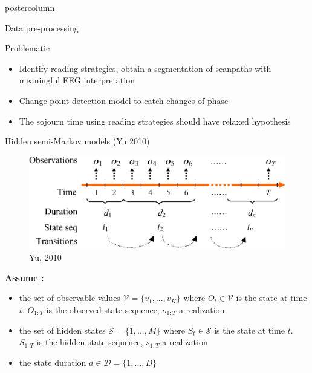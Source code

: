 \documentclass[final,hyperref={pdfpagelabels=false}]{beamer}
\begin{document}
\begin{frame}
\begin{columns}
\begin{column}{.50\textwidth}
\begin{beamercolorbox}[center,wd=\textwidth]{postercolumn}
\begin{minipage}[T]{.98\textwidth}
{\begin{block}{Data pre-processing}
            \end{block}
            \vfill
            \begin{block}{Problematic}
                \begin{itemize}
                    \item[\bullet] Identify reading strategies, obtain a segmentation of scanpaths with meaningful EEG interpretation
                    \item[\bullet] Change point detection model to catch changes of phase
                    \item[\bullet] The sojourn time using reading strategies should have relaxed hypothesis
                \end{itemize}
            \end{block}
            \vfill
            \begin{block}{Hidden semi-Markov models (Yu 2010)}
                \begin{figure}[H]
                    \includegraphics[width=.60\linewidth]{hsmm_representation.png}
                    \caption{Yu, 2010}
                \end{figure}
                \vskip-2cm
                \textbf{Assume :}
                \begin{itemize}
                    \item[\bullet] the set of observable values $\mathcal{V} = \{ v_1,..., v_K\}$
                    where $O_t \in \mathcal{V}$ is the state at time $t$. $O_{1:T}$ is the observed state sequence,
                    $o_{1:T}$ a realization
                    \item[\bullet] the set of hidden states $\mathcal{S}=\{1,...,M\}$
                    where $S_t \in \mathcal{S}$ is the state at time $t$. $S_{1:T}$ is the hidden state sequence,
                    $s_{1:T}$ a realization
                    \item[\bullet] the state duration $d \in \mathcal{D}=\{1,...,D\}$
                \end{itemize}


\end{block}}
\end{minipage}
\end{beamercolorbox}
\end{column}
\end{columns}
\end{frame}
\end{document}
